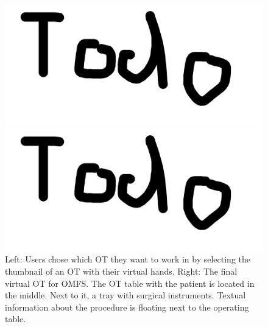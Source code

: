 \begin{figure}[ht]
  \centering
  \begin{minipage}{.5\textwidth}
    \centering
    \includegraphics[width=0.95\linewidth]{images/todo.png}
  \end{minipage}%
  \begin{minipage}{.5\textwidth}
    \centering
    \includegraphics[width=0.95\linewidth]{images/todo.png}
  \end{minipage}
  \caption{\label{fig::SceneSelect} Left: Users chose which OT they want to work in by selecting the thumbnail of an OT with their virtual hands. Right: The final virtual OT for OMFS. The OT table with the patient is located in the middle. Next to it, a tray with surgical instruments.
  Textual information about the procedure is floating next to the operating table.}
\end{figure}

